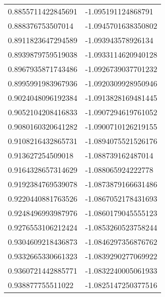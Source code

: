 \begin{supertabular}{ll}
0.8855711422845691  & -1.095191124868791    \\
0.888376753507014   & -1.0945701638350802   \\
0.8911823647294589  & -1.093943578926134    \\
0.8939879759519038  & -1.0933114620940128   \\
0.8967935871743486  & -1.0926739037701232   \\
0.8995991983967936  & -1.0920309928950946   \\
0.9024048096192384  & -1.0913828169481445   \\
0.9052104208416833  & -1.0907294619761052   \\
0.9080160320641282  & -1.0900710126219155   \\
0.9108216432865731  & -1.0894075521526176   \\
0.913627254509018   & -1.088739162487014    \\
0.9164328657314629  & -1.088065924222778    \\
0.9192384769539078  & -1.0873879166631486   \\
0.9220440881763526  & -1.0867052178431693   \\
0.9248496993987976  & -1.0860179045555123   \\
0.9276553106212424  & -1.0853260523758244   \\
0.9304609218436873  & -1.0846297356876762   \\
0.9332665330661323  & -1.0839290277069922   \\
0.9360721442885771  & -1.0832240005061933   \\
0.938877755511022   & -1.0825147250377516   \\
\end{supertabular}
